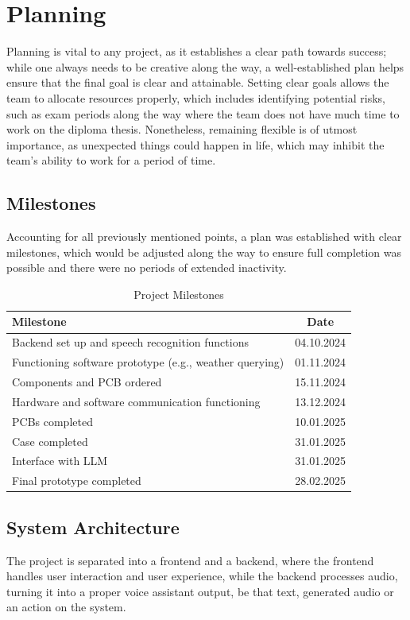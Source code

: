 \cleardoubleemptypage
\renewcommand*\chapterpagestyle{scrheadings}
\chapter{Planning}
Planning is vital to any project, as it establishes a clear path towards success;
while one always needs to be creative along the way, a well-established plan
helps ensure that the final goal is clear and attainable.
Setting clear goals allows the team to allocate resources properly,
which includes identifying potential risks, such as exam periods along the way
where the team does not have much time to work on the diploma thesis.
Nonetheless, remaining flexible is of utmost importance, as unexpected things
could happen in life, which may inhibit the team's ability to work for a period of time.

\section{Milestones}
Accounting for all previously mentioned points, a plan was established with clear milestones,
which would be adjusted along the way to ensure full completion was possible
and there were no periods of extended inactivity.

\begin{table}[h!]
\centering
\begin{tabular}{|l|c|}
\hline
\textbf{Milestone} & \textbf{Date} \\
\hline
Backend set up and speech recognition functions & 04.10.2024 \\
Functioning software prototype (e.g., weather querying) & 01.11.2024 \\
Components and PCB ordered & 15.11.2024 \\
Hardware and software communication functioning & 13.12.2024 \\
PCBs completed & 10.01.2025 \\
Case completed & 31.01.2025 \\
Interface with LLM & 31.01.2025 \\
Final prototype completed & 28.02.2025 \\
\hline
\end{tabular}
\caption{Project Milestones}
\end{table}

\section{System Architecture}
The project is separated into a frontend and a backend, where the frontend handles user interaction and user experience,
while the backend processes audio, turning it into a proper voice assistant output,
be that text, generated audio or an action on the system.

